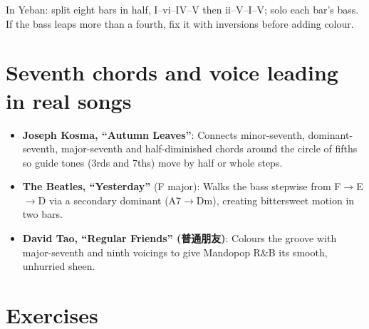 In Yeban: split eight bars in half, I--vi--IV--V then ii--V--I--V; solo each bar's bass. If the bass leaps more than a fourth, fix it with inversions before adding colour.

\section{Seventh chords and voice leading in real songs}

\begin{itemize}
  \item \textbf{Joseph Kosma, ``Autumn Leaves''}: Connects minor-seventh, dominant-seventh, major-seventh and half-diminished chords around the circle of fifths so guide tones (3rds and 7ths) move by half or whole steps.
  \item \textbf{The Beatles, ``Yesterday''} (F major): Walks the bass stepwise from F$\rightarrow$E$\rightarrow$D via a secondary dominant (A7$\rightarrow$Dm), creating bittersweet motion in two bars.
  \item \textbf{David Tao, ``Regular Friends'' (普通朋友)}: Colours the groove with major-seventh and ninth voicings to give Mandopop R\&B its smooth, unhurried sheen.
\end{itemize}

\section{Exercises}

